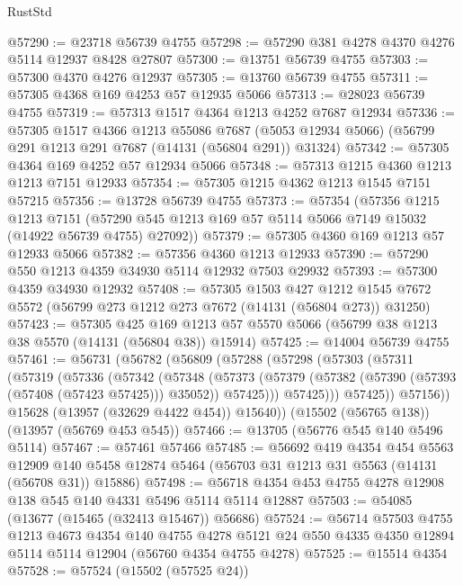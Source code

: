 \begin{lexlean}{RustStd}
\begin{coremodule}
@57290 := @23718 @56739 @4755
@57298 := @57290 @381 @4278 @4370 @4276 @5114 @12937 @8428 @27807
@57300 := @13751 @56739 @4755
@57303 := @57300 @4370 @4276 @12937
@57305 := @13760 @56739 @4755
@57311 := @57305 @4368 @169 @4253 @57 @12935 @5066
@57313 := @28023 @56739 @4755
@57319 := @57313 @1517 @4364 @1213 @4252 @7687 @12934
@57336 := @57305
    @1517
    @4366
    @1213
    @55086
    @7687
    (@5053 @12934 @5066)
    (@56799 @291 @1213 @291 @7687 (@14131 (@56804 @291)) @31324)
@57342 := @57305 @4364 @169 @4252 @57 @12934 @5066
@57348 := @57313 @1215 @4360 @1213 @1213 @7151 @12933
@57354 := @57305 @1215 @4362 @1213 @1545 @7151 @57215
@57356 := @13728 @56739 @4755
@57373 := @57354
    (@57356
      @1215
      @1213
      @7151
      (@57290 @545 @1213 @169 @57 @5114 @5066 @7149 @15032 (@14922 @56739 @4755) @27092))
@57379 := @57305 @4360 @169 @1213 @57 @12933 @5066
@57382 := @57356 @4360 @1213 @12933
@57390 := @57290 @550 @1213 @4359 @34930 @5114 @12932 @7503 @29932
@57393 := @57300 @4359 @34930 @12932
@57408 := @57305
    @1503
    @427
    @1212
    @1545
    @7672
    @5572
    (@56799 @273 @1212 @273 @7672 (@14131 (@56804 @273)) @31250)
@57423 := @57305
    @425
    @169
    @1213
    @57
    @5570
    @5066
    (@56799 @38 @1213 @38 @5570 (@14131 (@56804 @38)) @15914)
@57425 := @14004 @56739 @4755
@57461 := @56731
    (@56782
      (@56809
        (@57288
          (@57298
            (@57303
              (@57311
                (@57319
                  (@57336
                    (@57342
                      (@57348
                        (@57373
                          (@57379
                            (@57382 (@57390 (@57393 (@57408 (@57423 @57425))) @35052))
                            @57425)))
                      @57425)))
                @57425))
            @57156))
        @15628
        (@13957 (@32629 @4422 @454))
        @15640))
    (@15502 (@56765 @138))
    (@13957 (@56769 @453 @545))
@57466 := @13705 (@56776 @545 @140 @5496 @5114)
@57467 := @57461 @57466
@57485 := @56692
    @419
    @4354
    @454
    @5563
    @12909
    @140
    @5458
    @12874
    @5464
    (@56703 @31 @1213 @31 @5563 (@14131 (@56708 @31)) @15886)
@57498 := @56718 @4354 @453 @4755 @4278 @12908 @138 @545 @140 @4331 @5496 @5114 @5114 @12887
@57503 := @54085 (@13677 (@15465 (@32413 @15467)) @56686)
@57524 := @56714
    @57503
    @4755
    @1213
    @4673
    @4354
    @140
    @4755
    @4278
    @5121
    @24
    @550
    @4335
    @4350
    @12894
    @5114
    @5114
    @12904
    (@56760 @4354 @4755 @4278)
@57525 := @15514 @4354
@57528 := @57524 (@15502 (@57525 @24))

\end{coremodule}
\end{lexlean}
